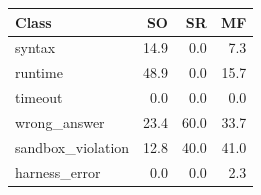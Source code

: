 \begin{tabular}{@{}lrrr@{}}
\toprule
Class & SO & SR & MF \\
\midrule
syntax & 14.9 & 0.0 & 7.3 \\
runtime & 48.9 & 0.0 & 15.7 \\
timeout & 0.0 & 0.0 & 0.0 \\
wrong\_answer & 23.4 & 60.0 & 33.7 \\
sandbox\_violation & 12.8 & 40.0 & 41.0 \\
harness\_error & 0.0 & 0.0 & 2.3 \\
\bottomrule
\end{tabular}
